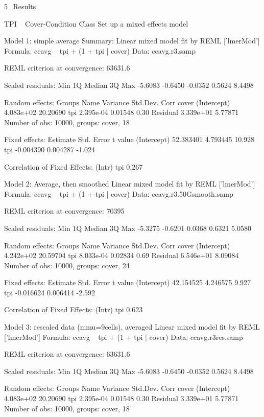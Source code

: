 5_Results

TPI ~ Cover-Condition Class
Set up a mixed effects model

Model 1: simple average
Summary:
Linear mixed model fit by REML ['lmerMod']
Formula: ccavg ~ tpi + (1 + tpi | cover)
   Data: ccavg.r3.samp

REML criterion at convergence: 63631.6

Scaled residuals: 
    Min      1Q  Median      3Q     Max 
-5.6083 -0.6450 -0.0352  0.5624  8.4498 

Random effects:
 Groups   Name        Variance  Std.Dev. Corr
 cover    (Intercept) 4.083e+02 20.20690     
          tpi         2.395e-04  0.01548 0.30
 Residual             3.339e+01  5.77871     
Number of obs: 10000, groups:  cover, 18

Fixed effects:
             Estimate Std. Error t value
(Intercept) 52.383401   4.793445  10.928
tpi         -0.004390   0.004287  -1.024

Correlation of Fixed Effects:
    (Intr)
tpi 0.267 

Model 2: Average, then smoothed
Linear mixed model fit by REML ['lmerMod']
Formula: ccavg ~ tpi + (1 + tpi | cover)
   Data: ccavg.r3.50Gsmooth.samp

REML criterion at convergence: 70395

Scaled residuals: 
    Min      1Q  Median      3Q     Max 
-5.3275 -0.6201  0.0368  0.6321  5.0580 

Random effects:
 Groups   Name        Variance  Std.Dev. Corr
 cover    (Intercept) 4.242e+02 20.59704     
          tpi         8.033e-04  0.02834 0.69
 Residual             6.546e+01  8.09084     
Number of obs: 10000, groups:  cover, 24

Fixed effects:
             Estimate Std. Error t value
(Intercept) 42.154525   4.246575   9.927
tpi         -0.016624   0.006414  -2.592

Correlation of Fixed Effects:
    (Intr)
tpi 0.623 

Model 3: rescaled data (mmu=9cells), averaged
Linear mixed model fit by REML ['lmerMod']
Formula: ccavg ~ tpi + (1 + tpi | cover)
   Data: ccavg.r3res.samp

REML criterion at convergence: 63631.6

Scaled residuals: 
    Min      1Q  Median      3Q     Max 
-5.6083 -0.6450 -0.0352  0.5624  8.4498 

Random effects:
 Groups   Name        Variance  Std.Dev. Corr
 cover    (Intercept) 4.083e+02 20.20690     
          tpi         2.395e-04  0.01548 0.30
 Residual             3.339e+01  5.77871     
Number of obs: 10000, groups:  cover, 18

